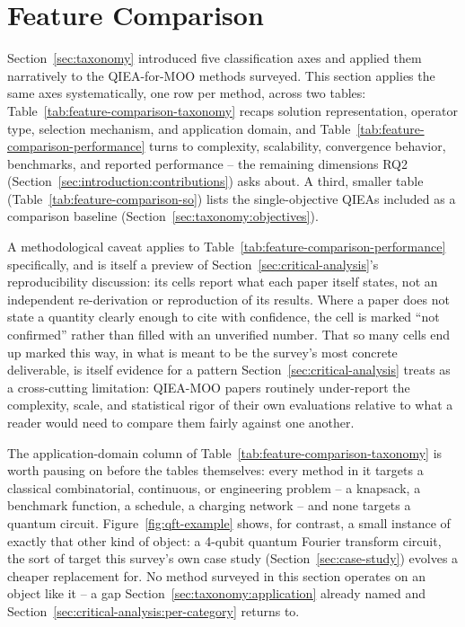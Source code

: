\section{Feature Comparison}
\label{sec:feature-comparison}

Section~\ref{sec:taxonomy} introduced five classification axes and
applied them narratively to the QIEA-for-MOO methods surveyed.
This section applies the same axes systematically, one row per method,
across two tables: Table~\ref{tab:feature-comparison-taxonomy} recaps
solution representation, operator type, selection mechanism, and application
domain, and
Table~\ref{tab:feature-comparison-performance} turns to complexity,
scalability, convergence behavior, benchmarks, and reported performance
-- the remaining dimensions RQ2
(Section~\ref{sec:introduction:contributions}) asks about. A third,
smaller table (Table~\ref{tab:feature-comparison-so}) lists the
single-objective QIEAs included as a comparison baseline
(Section~\ref{sec:taxonomy:objectives}).

A methodological caveat applies to Table~\ref{tab:feature-comparison-performance}
specifically, and is itself a preview of
Section~\ref{sec:critical-analysis}'s reproducibility discussion: its
cells report what each paper itself states, not an independent
re-derivation or reproduction of its results. Where a paper does not
state a quantity clearly enough to cite with confidence, the cell is
marked ``not confirmed'' rather than filled with an unverified number.
That so many cells end up marked this way, in what is meant to be the
survey's most concrete deliverable, is itself evidence for a pattern
Section~\ref{sec:critical-analysis} treats as a cross-cutting limitation:
QIEA-MOO papers routinely under-report the complexity, scale, and
statistical rigor of their own evaluations relative to what a reader
would need to compare them fairly against one another.

The application-domain column of Table~\ref{tab:feature-comparison-taxonomy}
is worth pausing on before the tables themselves: every method in it
targets a classical combinatorial, continuous, or engineering problem
-- a knapsack, a benchmark function, a schedule, a charging network --
and none targets a quantum circuit. Figure~\ref{fig:qft-example} shows,
for contrast, a small instance of exactly that other kind of object: a
4-qubit quantum Fourier transform circuit, the sort of target this
survey's own case study (Section~\ref{sec:case-study}) evolves a
cheaper replacement for. No method surveyed in this section operates on
an object like it -- a gap Section~\ref{sec:taxonomy:application}
already named and Section~\ref{sec:critical-analysis:per-category}
returns to.

